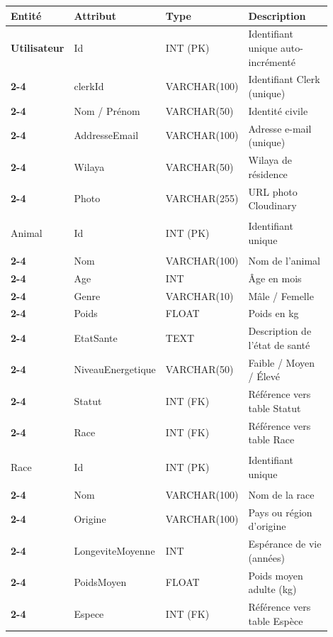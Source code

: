 \documentclass[12pt,a4paper]{report}
\begin{document}
\begin{small}
\begin{longtable}{|>{\bfseries}p{0.15\linewidth}|p{0.18\linewidth}|p{0.14\linewidth}|p{0.43\linewidth}|}
\hline
\rowcolor{adoptyBrown!15}
\textbf{Entité} & \textbf{Attribut} & \textbf{Type} & \textbf{Description} \\ \hline
\endhead

Utilisateur & Id & INT (PK) & Identifiant unique auto-incrémenté \\ \cline{2-4}
 & clerkId & VARCHAR(100) & Identifiant Clerk (unique) \\ \cline{2-4}
 & Nom / Prénom & VARCHAR(50) & Identité civile \\ \cline{2-4}
 & AddresseEmail & VARCHAR(100) & Adresse e-mail (unique) \\ \cline{2-4}
 & Wilaya & VARCHAR(50) & Wilaya de résidence \\ \cline{2-4}
 & Photo & VARCHAR(255) & URL photo Cloudinary \\ \hline

Animal & Id & INT (PK) & Identifiant unique \\ \cline{2-4}
 & Nom & VARCHAR(100) & Nom de l'animal \\ \cline{2-4}
 & Age & INT & Âge en mois \\ \cline{2-4}
 & Genre & VARCHAR(10) & Mâle / Femelle \\ \cline{2-4}
 & Poids & FLOAT & Poids en kg \\ \cline{2-4}
 & EtatSante & TEXT & Description de l'état de santé \\ \cline{2-4}
 & NiveauEnergetique & VARCHAR(50) & Faible / Moyen / Élevé \\ \cline{2-4}
 & Statut & INT (FK) & Référence vers table Statut \\ \cline{2-4}
 & Race & INT (FK) & Référence vers table Race \\ \hline

Race & Id & INT (PK) & Identifiant unique \\ \cline{2-4}
 & Nom & VARCHAR(100) & Nom de la race \\ \cline{2-4}
 & Origine & VARCHAR(100) & Pays ou région d'origine \\ \cline{2-4}
 & LongeviteMoyenne & INT & Espérance de vie (années) \\ \cline{2-4}
 & PoidsMoyen & FLOAT & Poids moyen adulte (kg) \\ \cline{2-4}
 & Espece & INT (FK) & Référence vers table Espèce \\ \hline


\end{longtable}
\end{small}
\end{document}
